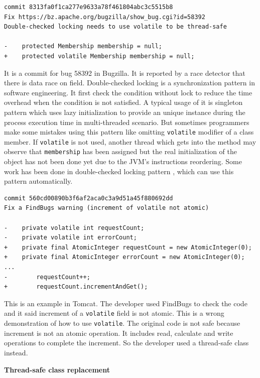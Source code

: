 \begin{lstlisting}
commit 8313fa0f1ca277e9633a78f461804abc3c5515b8
Fix https://bz.apache.org/bugzilla/show_bug.cgi?id=58392
Double-checked locking needs to use volatile to be thread-safe

-    protected Membership membership = null;
+    protected volatile Membership membership = null;
\end{lstlisting}
It is a commit for bug 58392 in Bugzilla. It is reported by a race detector that there is data race on field. Double-checked locking is a synchronization pattern in software engineering. It first check the condition without lock to reduce the time overhead when the condition is not satisfied. A typical usage of it is singleton pattern which uses lazy initialization to provide an unique instance during the process execution time in multi-threaded scenario. But sometimes programmers make some mistakes using this pattern like omitting \texttt{volatile} modifier of a class member. If \texttt{volatile} is not used, another thread which gets into the method may observe that \texttt{membership} has been assigned but the real initialization of the object has not been done yet due to the JVM's instructions reordering. Some work has been done in double-checked locking pattern \cite{conf/ispass/IshizakiDN14}, which can use this pattern automatically.

\begin{lstlisting}
commit 560cd00890b3f6af2aca0c3a9d51a45f880692dd
Fix a FindBugs warning (increment of volatile not atomic)

-    private volatile int requestCount;
-    private volatile int errorCount;
+    private final AtomicInteger requestCount = new AtomicInteger(0);
+    private final AtomicInteger errorCount = new AtomicInteger(0);
...
-        requestCount++;
+        requestCount.incrementAndGet();
\end{lstlisting}

This is an example in Tomcat. The developer used FindBugs to check the code and it said increment of a \texttt{volatile} field is not atomic. This is a wrong demonstration of how to use \texttt{volatile}. The original code is not safe because increment is not an atomic operation. It includes read, calculate and write operations to complete the increment. So the developer used a thread-safe class instead.

\textbf{Thread-safe class replacement}

